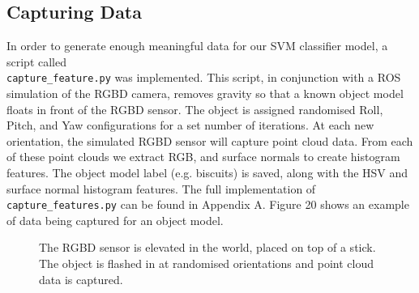 \documentclass[a4paper]{article}
\begin{document}
\subsection{Capturing Data}
In order to generate enough meaningful data for our SVM classifier model, a script called\\ \verb|capture_feature.py| was implemented. This script, in conjunction with a ROS simulation of the RGBD camera, removes gravity so that a known object model floats in front of the RGBD sensor. The object is assigned randomised Roll, Pitch, and Yaw configurations for a set number of iterations. At each new orientation, the simulated RGBD sensor will capture point cloud data. From each of these point clouds we extract RGB, and surface normals to create histogram features. The object model label (e.g. biscuits) is saved, along with the HSV and surface normal histogram features. The full implementation of \verb|capture_features.py| can be found in Appendix A. Figure 20 shows an example of data being captured for an object model.
\begin{figure}[h]
	\centering
	\caption{The RGBD sensor is elevated in the world, placed on top of a stick. The object is flashed in at randomised orientations and point cloud data is captured.}
\end{figure}
\end{document}
